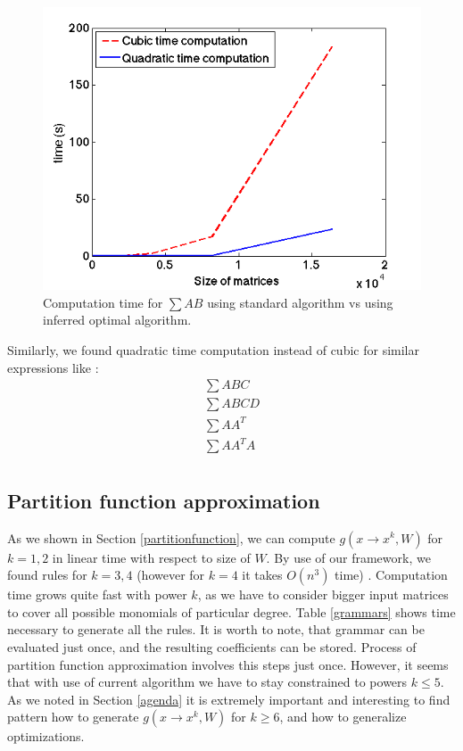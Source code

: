 \documentclass{article}
\begin{document}
\begin{figure}[h]
\centering
\includegraphics[scale=0.3]{img/ab.png}
\caption{Computation time for $\sum AB$ using standard algorithm vs using inferred optimal algorithm.}
\label{ab}
\end{figure}


Similarly, we found quadratic time computation instead of cubic for similar expressions like : 
\begin{align*}
	\sum ABC\\
	\sum ABCD\\
	\sum AA^T\\
	\sum AA^TA\\
\end{align*}


\subsection{Partition function approximation}

As we shown in Section \ref{partitionfunction}, we can compute $g(x \rightarrow x^k, W)$ for $k = 1, 2$ in
linear time with respect to size of $W$. By use of
our framework, we found rules for $k = 3, 4$ (however for $k = 4$ it takes $O(n^3)$ time) . Computation time grows quite fast with power $k$, as we have to consider 
bigger input matrices to cover all possible monomials of particular degree. Table \ref{grammars} shows time necessary to
generate all the rules. It is worth to note, that grammar can be evaluated just once, and the resulting coefficients can 
be stored. Process of partition function approximation involves this steps just once. However, it seems that 
with use of current algorithm we have to stay constrained to powers $k \leq 5$. As we noted in Section \ref{agenda}
it is extremely important and interesting to find pattern how to generate $g(x \rightarrow x^k, W)$ for $k \geq 6$, and
how to generalize optimizations. 
\end{document}
